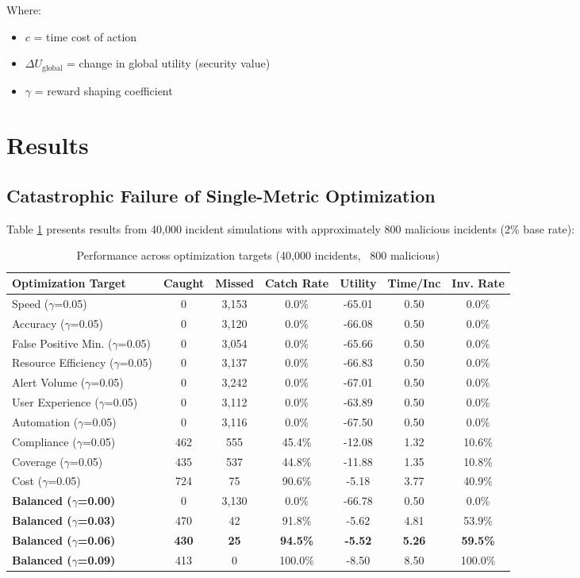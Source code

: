 \documentclass[11pt]{article}
\begin{document}
Where:
\begin{itemize}
\item $c$ = time cost of action
\item $\Delta U_{\text{global}}$ = change in global utility (security value)
\item $\gamma$ = reward shaping coefficient
\end{itemize}

\section{Results}

\subsection{Catastrophic Failure of Single-Metric Optimization}
Table \ref{tab:full_results} presents results from 40,000 incident simulations with approximately 800 malicious incidents (2\% base rate):

\begin{table}[h]
\centering
\small
\begin{tabular}{@{}lcccccc@{}}\toprule
Optimization Target & Caught & Missed & Catch Rate & Utility & Time/Inc & Inv. Rate \\\midrule
Speed ($\gamma$=0.05) & 0 & 3,153 & 0.0\% & -65.01 & 0.50 & 0.0\% \\
Accuracy ($\gamma$=0.05) & 0 & 3,120 & 0.0\% & -66.08 & 0.50 & 0.0\% \\
False Positive Min. ($\gamma$=0.05) & 0 & 3,054 & 0.0\% & -65.66 & 0.50 & 0.0\% \\
Resource Efficiency ($\gamma$=0.05) & 0 & 3,137 & 0.0\% & -66.83 & 0.50 & 0.0\% \\
Alert Volume ($\gamma$=0.05) & 0 & 3,242 & 0.0\% & -67.01 & 0.50 & 0.0\% \\
User Experience ($\gamma$=0.05) & 0 & 3,112 & 0.0\% & -63.89 & 0.50 & 0.0\% \\
Automation ($\gamma$=0.05) & 0 & 3,116 & 0.0\% & -67.50 & 0.50 & 0.0\% \\
\midrule
Compliance ($\gamma$=0.05) & 462 & 555 & 45.4\% & -12.08 & 1.32 & 10.6\% \\
Coverage ($\gamma$=0.05) & 435 & 537 & 44.8\% & -11.88 & 1.35 & 10.8\% \\
Cost ($\gamma$=0.05) & 724 & 75 & 90.6\% & -5.18 & 3.77 & 40.9\% \\
\midrule
\textbf{Balanced ($\gamma$=0.00)} & 0 & 3,130 & 0.0\% & -66.78 & 0.50 & 0.0\% \\
\textbf{Balanced ($\gamma$=0.03)} & 470 & 42 & 91.8\% & -5.62 & 4.81 & 53.9\% \\
\textbf{Balanced ($\gamma$=0.06)} & \textbf{430} & \textbf{25} & \textbf{94.5\%} & \textbf{-5.52} & \textbf{5.26} & \textbf{59.5\%} \\
\textbf{Balanced ($\gamma$=0.09)} & 413 & 0 & 100.0\% & -8.50 & 8.50 & 100.0\% \\
\bottomrule
\end{tabular}
\caption{Performance across optimization targets (40,000 incidents, ~800 malicious)\label{tab:full_results}}
\end{table}
\end{document}
